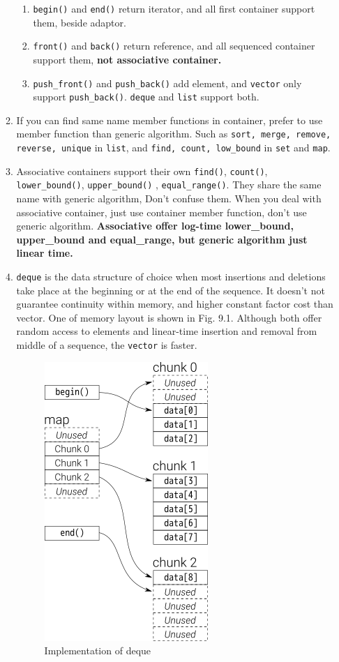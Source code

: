 \documentclass[a4paper,11pt,twoside]{book}
\begin{document}
\begin{itemize}
\begin{enumerate}
\begin{enumerate}
\item \texttt{begin()} and \texttt{end()} return iterator, and all first container support them, beside adaptor.

\item \texttt{front()} and \texttt{back()} return reference, and all sequenced container support them, \textbf{not associative container.}

\item \texttt{push\_front()} and \texttt{push\_back()} add element, and \texttt{vector} only support \texttt{push\_back()}. \texttt{deque} and \texttt{list} support both.
\end{enumerate}

\item  If you can find same name member functions in container, prefer to use member function than generic algorithm. Such as \texttt{sort, merge, remove, reverse, unique} in \texttt{list}, and \texttt{find, count, low\_bound} in \texttt{set} and \texttt{map}. 

\item Associative containers support their own \texttt{find()}, \texttt{count()},  \texttt{lower\_bound()}, \texttt{upper\_bound()} , \texttt{equal\_range()}. They share the same name with generic algorithm, Don't confuse them. When you deal with associative container, just use container member function, don't use generic algorithm. \textbf{Associative offer log-time lower\_bound, upper\_bound and equal\_range, but generic algorithm just linear time.}


\item \texttt{deque} is the data structure of choice when most insertions and deletions take place at the beginning or at the end of the sequence. It doesn't not guarantee continuity within memory, and higher constant factor cost than vector. One of memory layout is shown in Fig. 9.1.  Although both offer random access to elements and linear-time insertion and removal from middle of a sequence, the \texttt{vector} is faster.  

\begin{figure}[ht]
	\centering
	\includegraphics[width=0.2\linewidth]{pics/queue.png}
	\caption{Implementation of deque}
	\label{fig:queue}
\end{figure}



\end{enumerate}
\end{itemize}
\end{document}
